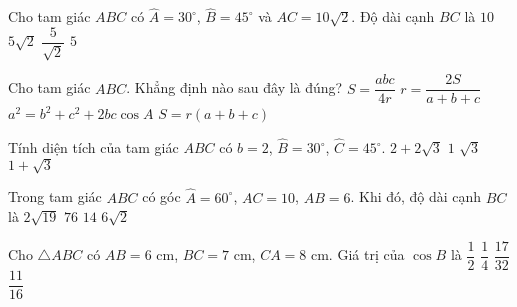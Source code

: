 \begin{ex}
	Cho tam giác $ABC$ có $\widehat{A}=30^\circ$, $\widehat{B}=45^\circ$ và $AC=10\sqrt{2}$. Độ dài cạnh $BC$ là
	\choice
	{\True $10$}
	{$5\sqrt{2}$}
	{$\dfrac{5}{\sqrt{2}}$}
	{$5$}
\end{ex}
\begin{ex}
	Cho tam giác $ABC$. Khẳng định nào sau đây là đúng?
	\choice
	{$S=\dfrac{abc}{4r}$}
	{\True $r=\dfrac{2S}{a+b+c}$}
	{$a^2=b^2+c^2+2bc\cos A$}
	{$S=r(a+b+c)$}
\end{ex}
\begin{ex}
	Tính diện tích của tam giác $ABC$ có $b=2$, $\widehat{B}=30^\circ$, $\widehat{C}=45^\circ$.
	\choice
	{$2+2\sqrt{3}$}
	{$1$}
	{$\sqrt{3}$}
	{\True $1+\sqrt{3}$}
\end{ex}
\begin{ex}
	Trong tam giác $ABC$ có góc $\widehat{A}=60^{\circ}$, $AC=10$, $AB=6$. Khi đó, độ dài cạnh $BC$ là
	\choice
	{\True $2\sqrt{19}$}
	{$76$}
	{$14$}
	{$6\sqrt{2}$}
\end{ex}
\begin{ex}
	Cho $\triangle ABC$ có $AB=6$ cm, $BC=7$ cm, $CA=8$ cm. Giá trị của $\cos B$ là
	\choice
	{$\dfrac{1}{2}$}
	{\True $\dfrac{1}{4}$}
	{$\dfrac{17}{32}$}
	{$\dfrac{11}{16}$}
\end{ex}
